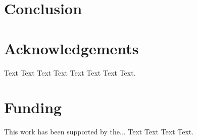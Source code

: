 \documentclass[letter]{bioinfo}
\begin{document}
\section{Conclusion}


%

\enlargethispage{12pt}




\section*{Acknowledgements}

Text Text Text Text Text Text  Text Text.  
\vspace*{-12pt}

\section*{Funding}

This work has been supported by the... Text Text  Text Text.\vspace*{-12pt}


%
%
%
%
%
%

\end{document}
